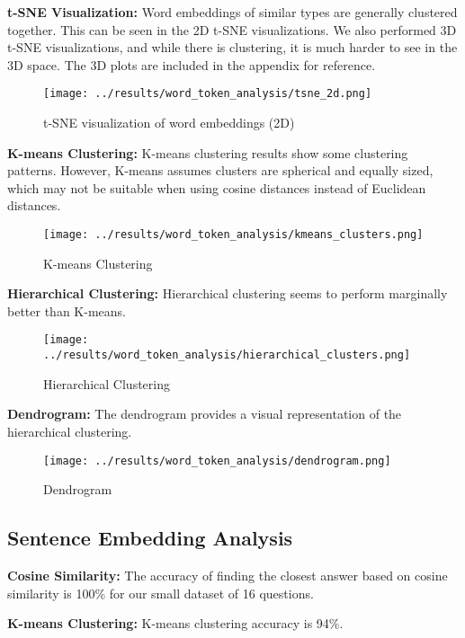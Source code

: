 \documentclass{scrartcl}
\begin{document}
\textbf{t-SNE Visualization:} Word embeddings of similar types are generally clustered together. This can be seen in the 2D t-SNE visualizations. We also performed 3D t-SNE visualizations, and while there is clustering, it is much harder to see in the 3D space. The 3D plots are included in the appendix for reference.

\begin{figure}[H]
    \centering
    \texttt{[image: ../results/word\_token\_analysis/tsne\_2d.png]}
    \caption{t-SNE visualization of word embeddings (2D)}
\end{figure}

\textbf{K-means Clustering:} K-means clustering results show some clustering patterns. However, K-means assumes clusters are spherical and equally sized, which may not be suitable when using cosine distances instead of Euclidean distances.

\begin{figure}[H]
    \centering
    \texttt{[image: ../results/word\_token\_analysis/kmeans\_clusters.png]}
    \caption{K-means Clustering}
\end{figure}

\textbf{Hierarchical Clustering:} Hierarchical clustering seems to perform marginally better than K-means.

\begin{figure}[H]
    \centering
    \texttt{[image: ../results/word\_token\_analysis/hierarchical\_clusters.png]}
    \caption{Hierarchical Clustering}
\end{figure}

\textbf{Dendrogram:} The dendrogram provides a visual representation of the hierarchical clustering.

\begin{figure}[H]
    \centering
    \texttt{[image: ../results/word\_token\_analysis/dendrogram.png]}
    \caption{Dendrogram}
\end{figure}

\subsection{Sentence Embedding Analysis}
\textbf{Cosine Similarity:} The accuracy of finding the closest answer based on cosine similarity is 100\% for our small dataset of 16 questions.

\textbf{K-means Clustering:} K-means clustering accuracy is 94\%.
\end{document}
